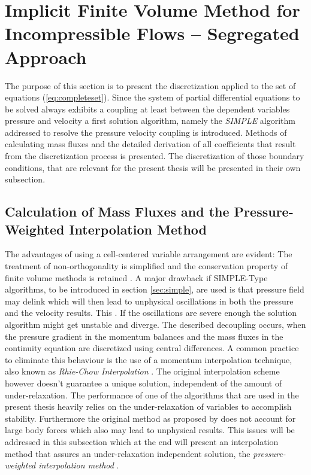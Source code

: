 \section{Implicit Finite Volume Method for Incompressible Flows -- Segregated Approach}

  The purpose of this section is to present the discretization applied to the set of equations (\ref{eq:completeset}). Since the system of partial differential equations to be solved always exhibits a coupling at least between the dependent variables pressure and velocity a first solution algorithm, namely the \emph{SIMPLE} algorithm addressed to resolve the pressure velocity coupling is introduced. Methods of calculating mass fluxes and the detailed derivation of all coefficients that result from the discretization process is presented. The discretization of those boundary conditions, that are relevant for the present thesis will be presented in their own subsection.

  \subsection{Calculation of Mass Fluxes and the Pressure-Weighted Interpolation Method}
  \label{sec:massflux}

  The advantages of using a cell-centered variable arrangement are evident: The treatment of non-orthogonality is simplified and the conservation property of finite volume methods is retained \cite{choi99,majumdar88,miller88,zhang14}. A major drawback if SIMPLE-Type algorithms, to be introduced in section \ref{sec:simple}, are used is that pressure field may delink which will then lead to unphysical oscillations in both the pressure and the velocity results. This . If the oscillations are severe enough the solution algorithm might get unstable and diverge. The described decoupling occurs, when the pressure gradient in the momentum balances and the mass fluxes in the continuity equation are discretized using central differences. A common practice to eliminate this behaviour is the use of a momentum interpolation technique, also known as \emph{Rhie-Chow Interpolation} \cite{rhie82}. The original interpolation scheme however doesn't guarantee a unique solution, independent of the amount of under-relaxation. The performance of one of the algorithms that are used in the present thesis heavily relies on the under-relaxation of variables to accomplish stability. Furthermore the original method as proposed by \cite{rhie82} does not account for large body forces which also may lead to unphysical results. This issues will be addressed in this subsection which at the end will present an interpolation method that assures an under-relaxation independent solution, the \emph{pressure-weighted interpolation method} \cite{miller88}.

